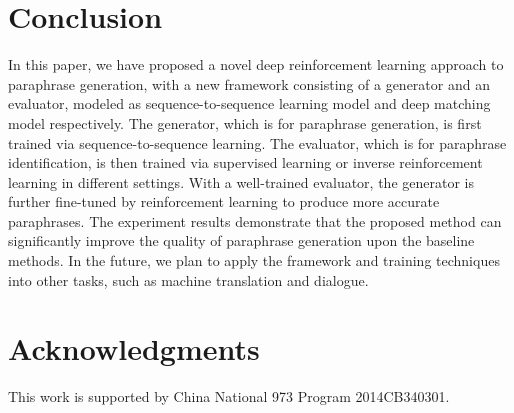 \documentclass[11pt,a4paper]{article}
\begin{document}
\section{Conclusion}
\vspace{-5pt}
    In this paper, we have proposed a novel deep reinforcement learning approach to paraphrase generation, with a new framework consisting of a generator and an evaluator, modeled as sequence-to-sequence learning model and deep matching model respectively. The generator, which is for paraphrase generation, is first trained via sequence-to-sequence learning. The evaluator, which is for paraphrase identification, is then trained via supervised learning or inverse reinforcement learning in different settings. With a well-trained evaluator, the generator is further fine-tuned by reinforcement learning to produce more accurate paraphrases. The experiment results demonstrate that the proposed method can significantly improve the quality of paraphrase generation upon the baseline methods. In the future, we plan to apply the framework and training techniques into other tasks, such as machine translation and dialogue.

\section*{Acknowledgments}
\vspace{-5pt}
This work is supported by China National 973 Program 2014CB340301.





\newpage
\appendix
\end{document}
